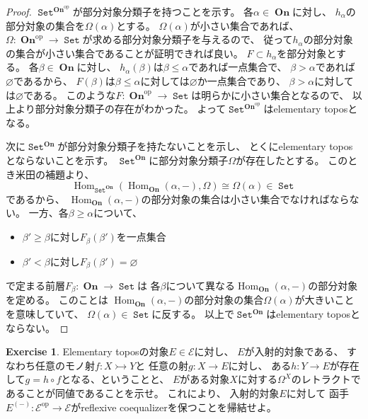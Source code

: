 \documentclass[uplatex]{jsarticle}
\theoremstyle{definition}
\newtheorem{prob}[prob]{Exercise}
\renewcommand{\emptyset}{\varnothing}
\newcommand{\op}{\mathrm{op}}
\newcommand{\rtot}{\rightarrowtail}
\DeclareMathOperator{\Hom}{Hom}
\def\mcE{\mathcal{E}}
\DeclareMathOperator{\sfSet}{\mathtt{Set}}
\DeclareMathOperator{\On}{\mathbf{On}}
\begin{document}
\begin{proof}
  \(\sfSet^{\On^{\op}}\)が部分対象分類子を持つことを示す。
  各\(\alpha\in \On\)に対し、
  \(h_\alpha\)の部分対象の集合を\(\Omega(\alpha)\)とする。
  \(\Omega(\alpha)\)が小さい集合であれば、
  \(\Omega:\On^{\op}\to \sfSet\)が求める部分対象分類子を与えるので、
  従って\(h_\alpha\)の部分対象の集合が小さい集合であることが証明できれば良い。
  \(F\subset h_\alpha\)を部分対象とする。
  各\(\beta\in \On\)に対し、
  \(h_\alpha(\beta)\)は\(\beta \leq \alpha\)であれば一点集合で、
  \(\beta > \alpha\)であれば\(\emptyset\)であるから、
  \(F(\beta)\)は\(\beta \leq \alpha\)に対しては\(\emptyset\)か一点集合であり、
  \(\beta > \alpha\)に対しては\(\emptyset\)である。
  このような\(F:\On^{\op}\to \sfSet\)は明らかに小さい集合となるので、
  以上より部分対象分類子の存在がわかった。
  よって\(\sfSet^{\On^{\op}}\)はelementary toposとなる。

  次に\(\sfSet^{\On}\)が部分対象分類子を持たないことを示し、
  とくにelementary toposとならないことを示す。
  \(\sfSet^{\On}\)に部分対象分類子\(\Omega\)が存在したとする。
  このとき米田の補題より、
  \[\Hom_{\sfSet^{\On}}(\Hom_{\On}(\alpha,-),\Omega)\cong \Omega(\alpha)\in \sfSet\]
  であるから、
  \(\Hom_{\On}(\alpha,-)\)の部分対象の集合は小さい集合でなければならない。
  一方、各\(\beta \geq \alpha\)について、
  \begin{itemize}
    \item \(\beta' \geq \beta\)に対し\(F_\beta(\beta')\)を一点集合
    \item \(\beta' < \beta\)に対し\(F_\beta(\beta') = \emptyset\)
  \end{itemize}
  で定まる前層\(F_\beta:\On\to \sfSet\)は
  各\(\beta\)について異なる\(\Hom_{\On}(\alpha,-)\)の部分対象を定める。
  このことは
  \(\Hom_{\On}(\alpha,-)\)の部分対象の集合\(\Omega(\alpha)\)が大きいことを意味していて、
  \(\Omega(\alpha)\in \sfSet\)に反する。
  以上で\(\sfSet^{\On}\)はelementary toposとならない。
\end{proof}





\begin{prob}\label{prob: 1.5}
  Elementary toposの対象\(E\in \mcE\)に対し、
  \(E\)が入射的対象である、
  すなわち任意のモノ射\(f:X\rtot Y\)と
  任意の射\(g:X\to E\)に対し、
  ある\(h:Y\to E\)が存在して\(g = h\circ f\)となる、ということと、
  \(E\)がある対象\(X\)に対する\(\Omega^X\)のレトラクトであることが同値であることを示せ。
  これにより、
  入射的対象\(E\)に対して
  函手\(E^{(-)}:\mcE^{\op} \to \mcE\)がreflexive coequalizerを保つことを帰結せよ。
\end{prob}
\end{document}
